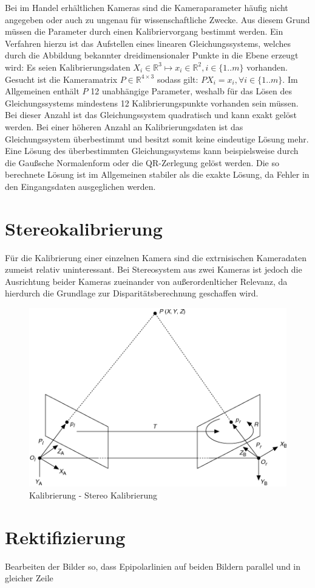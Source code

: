 Bei im Handel erh\"altlichen Kameras sind die Kameraparameter h\"aufig nicht angegeben oder auch zu ungenau f\"ur wissenschaftliche Zwecke. Aus diesem Grund m\"ussen die Parameter durch einen Kalibriervorgang bestimmt werden. Ein Verfahren hierzu ist das Aufstellen eines linearen Gleichungssystems, welches durch die Abbildung bekannter dreidimensionaler Punkte in die Ebene erzeugt wird:
Es seien Kalibrierungsdaten \(X_i \in \mathbb{R}^3 \mapsto x_i \in \mathbb{R}^2, i \in \{1..m\} \) vorhanden. Gesucht ist die Kameramatrix \( P\in \mathbb{R}^{4 \times 3} \) sodass gilt: \( PX_i=x_i,  \forall i \in \{1..m\} \). Im Allgemeinen enth\"alt \(P\) 12 unabh\"angige Parameter, weshalb f\"ur das L\"osen des Gleichungssystems mindestens 12 Kalibrierungspunkte vorhanden sein m\"ussen. Bei dieser Anzahl ist das Gleichungssystem quadratisch und kann exakt gel\"ost werden. Bei einer h\"oheren Anzahl an Kalibrierungsdaten ist das Gleichungssystem \"uberbestimmt und besitzt somit keine eindeutige L\"osung mehr. Eine L\"osung des \"uberbestimmten Gleichungssystems kann beispielsweise durch die Gau\ss{}sche Normalenform oder die QR-Zerlegung gel\"ost werden. Die so berechnete L\"osung ist im Allgemeinen stabiler als die exakte L\"osung, da Fehler in den Eingangsdaten ausgeglichen werden.

\section{Stereokalibrierung}

F\"ur die Kalibrierung einer einzelnen Kamera sind die extrnisischen Kameradaten zumeist relativ uninteressant. Bei Stereosystem aus zwei Kameras ist jedoch die Ausrichtung beider Kameras zueinander von au\ss{}erordenlticher Relevanz, da hierdurch die Grundlage zur Disparit\"atsberechnung geschaffen wird. 

\begin{figure}
 \centering
 \includegraphics[width=1\textwidth]{media/calibration/stereo_calibration2.png}
 \caption{Kalibrierung - Stereo Kalibrierung}
 \label{fig:calibration_radial}
\end{figure}

\section{Rektifizierung}

Bearbeiten der Bilder so, dass Epipolarlinien auf beiden Bildern parallel und in gleicher Zeile
